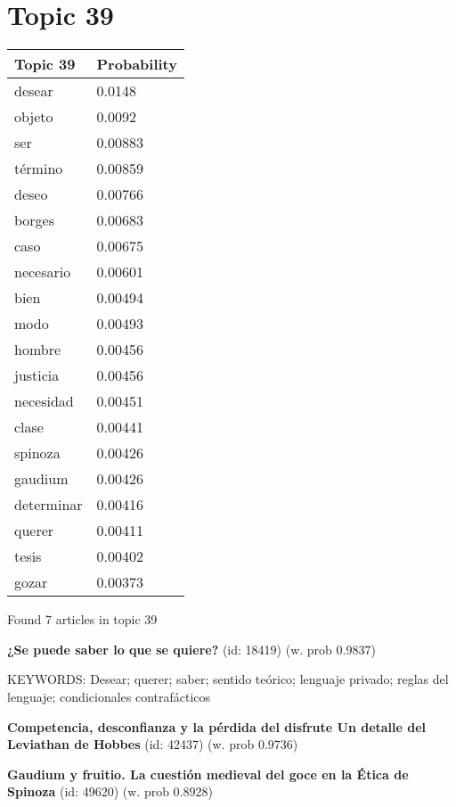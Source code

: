 \documentclass{article}
\begin{document}
\vfill
\newpage


\centering
\thispagestyle{empty}
\section*{Topic 39}\vfill
\begin{tabular}{ll}
\toprule
   Topic 39 & Probability \\
\midrule
     desear &      0.0148 \\
     objeto &      0.0092 \\
        ser &     0.00883 \\
    término &     0.00859 \\
      deseo &     0.00766 \\
     borges &     0.00683 \\
       caso &     0.00675 \\
  necesario &     0.00601 \\
       bien &     0.00494 \\
       modo &     0.00493 \\
     hombre &     0.00456 \\
   justicia &     0.00456 \\
  necesidad &     0.00451 \\
      clase &     0.00441 \\
    spinoza &     0.00426 \\
    gaudium &     0.00426 \\
 determinar &     0.00416 \\
     querer &     0.00411 \\
      tesis &     0.00402 \\
      gozar &     0.00373 \\
\bottomrule
\end{tabular}

\vfill
Found 7 articles in topic 39
\vfill

\textbf{¿Se puede saber lo que se quiere?} (id: 18419)
 (w. prob 0.9837)


KEYWORDS:
Desear; querer; saber; sentido teórico; lenguaje privado; reglas del lenguaje; condicionales contrafácticos
\vfill

\textbf{Competencia, desconfianza y la pérdida del disfrute Un detalle del Leviathan de Hobbes} (id: 42437)
 (w. prob 0.9736)
\vfill

\textbf{Gaudium y fruitio. La cuestión medieval del goce en la Ética de Spinoza} (id: 49620)
 (w. prob 0.8928)
\end{document}

